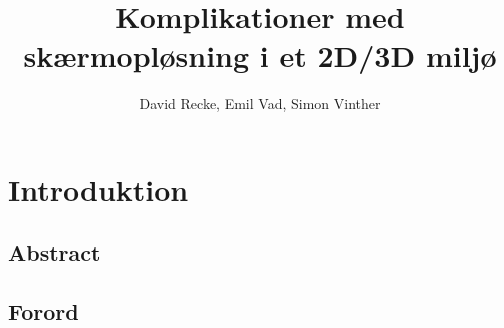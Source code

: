 

\author{David Recke, Emil Vad, Simon Vinther}
\title{Komplikationer med skærmopløsning i et 2D/3D miljø}



	\maketitle
	
	\tableofcontents
	
	\chapter{Introduktion}

		\section{Abstract}
				
		
		\section{Forord}
		
		
		

		
	

	\printbibliography


